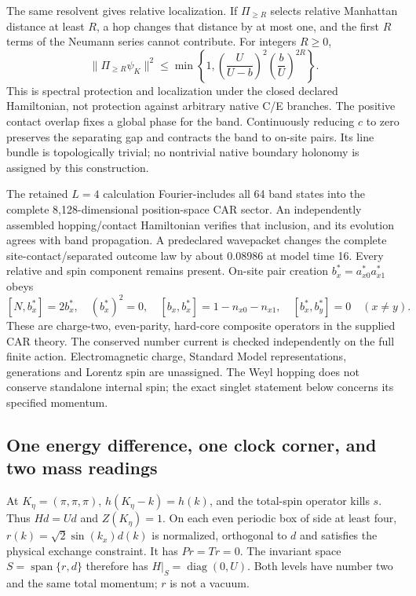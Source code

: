 The same resolvent gives relative localization. If $\Pi_{\ge R}$ selects
relative Manhattan distance at least $R$, a hop changes that distance by at
most one, and the first $R$ terms of the Neumann series cannot contribute.
For integers $R\ge0$,
\[
 \|\Pi_{\ge R}\psi_K\|^2\le
 \min\left\{1,\left(\frac{U}{U-b}\right)^2
                    \left(\frac bU\right)^{2R}\right\}.
\]
This is spectral protection and localization under the closed declared
Hamiltonian, not protection against arbitrary native C/E branches.
The positive contact overlap fixes a global phase for the band. Continuously
reducing $c$ to zero preserves the separating gap and contracts the band to
on-site pairs. Its line bundle is topologically trivial; no nontrivial
native boundary holonomy is assigned by this construction.

The retained $L=4$ calculation Fourier-includes all 64 band states into
the complete 8,128-dimensional position-space CAR sector. An independently
assembled hopping/contact Hamiltonian verifies that inclusion, and its
evolution agrees with band propagation. A predeclared wavepacket changes
the complete site-contact/separated outcome law by about $0.08986$ at model
time 16. Every relative and spin component remains present. On-site pair
creation $b_x^*=a_{x0}^*a_{x1}^*$ obeys
\[
 [N,b_x^*]=2b_x^*,\quad (b_x^*)^2=0,\quad
 [b_x,b_x^*]=1-n_{x0}-n_{x1},\quad [b_x^*,b_y^*]=0\quad(x\ne y).
\]
These are charge-two, even-parity, hard-core composite operators in the
supplied CAR theory. The conserved number current is checked independently
on the full finite action. Electromagnetic charge, Standard Model
representations, generations and Lorentz spin are unassigned. The
Weyl hopping does not conserve standalone internal spin; the exact singlet
statement below concerns its specified momentum.

\subsection{One energy difference, one clock corner, and two mass readings}
At $K_\eta=(\pi,\pi,\pi)$, $h(K_\eta-k)=h(k)$, and the total-spin
operator kills $s$. Thus $Hd=Ud$ and $Z(K_\eta)=1$. On each even periodic
box of side at least four, $r(k)=\sqrt2\sin(k_x)d(k)$ is normalized,
orthogonal to $d$ and satisfies the physical exchange constraint. It has
$Pr=Tr=0$. The invariant space $S=\operatorname{span}\{r,d\}$ therefore
has $H|_S=\operatorname{diag}(0,U)$. Both levels have number two and the
same total momentum; $r$ is not a vacuum.

